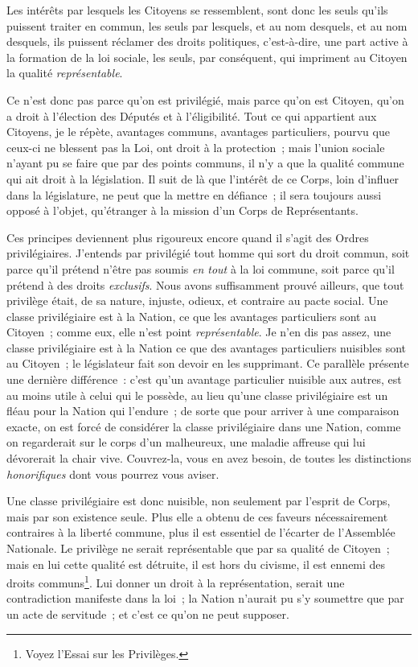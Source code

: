 \documentclass[french,twoside]{book} %
\begin{document}
Les intérêts par lesquels les Citoyens se ressemblent, sont donc les seuls qu’ils puissent traiter en commun, les seuls par lesquels, et au nom desquels, et au nom desquels, ils puissent réclamer des droits politiques, c’est-à-dire, une part active à la formation de la loi sociale, les seuls, par conséquent, qui impriment au Citoyen la qualité {\itshape représentable}.\par
Ce n’est donc pas parce qu’on est privilégié, mais parce qu’on est Citoyen, qu’on a droit à l’élection des Députés et à l’éligibilité. Tout ce qui appartient aux Citoyens, je le répète, avantages communs, avantages particuliers, pourvu que ceux-ci ne blessent pas la Loi, ont droit à la protection ; mais l’union sociale n’ayant pu se faire que par des points communs, il n’y a que la qualité commune qui ait droit à la législation. Il suit de là que l’intérêt de ce Corps, loin d’influer dans la législature, ne peut que la mettre en défiance ; il sera toujours aussi opposé à l’objet, qu’étranger à la mission d’un Corps de Représentants.\par
Ces principes deviennent plus rigoureux encore quand il s’agit des Ordres privilégiaires. J’entends par privilégié tout homme qui sort du droit commun, soit parce qu’il prétend n’être pas soumis {\itshape en tout} à la loi commune, soit parce qu’il prétend à des droits {\itshape exclusifs}. Nous avons suffisamment prouvé ailleurs, que tout privilège était, de sa nature, injuste, odieux, et contraire au pacte social. Une classe privilégiaire est à la Nation, ce que les avantages particuliers sont au Citoyen ; comme eux, elle n’est point {\itshape représentable}. Je n’en dis pas assez, une classe privilégiaire est à la Nation ce que des avantages particuliers nuisibles sont au Citoyen ; le législateur fait son devoir en les supprimant. Ce parallèle présente une dernière différence : c’est qu’un avantage particulier nuisible aux autres, est au moins utile à celui qui le possède, au lieu qu’une classe privilégiaire est un fléau pour la Nation qui l’endure ; de sorte que pour arriver à une comparaison exacte, on est forcé de considérer la classe privilégiaire dans une Nation, comme on regarderait sur le corps d’un malheureux, une maladie affreuse qui lui dévorerait la chair vive. Couvrez-la, vous en avez besoin, de toutes les distinctions {\itshape honorifiques} dont vous pourrez vous aviser.\par
Une classe privilégiaire est donc nuisible, non seulement par l’esprit de Corps, mais par son existence seule. Plus elle a obtenu de ces faveurs nécessairement contraires à la liberté commune, plus il est essentiel de l’écarter de l’Assemblée Nationale. Le privilège ne serait représentable que par sa qualité de Citoyen ; mais en lui cette qualité est détruite, il est hors du civisme, il est ennemi des droits communs\footnote{Voyez l’Essai sur les Privilèges.}. Lui donner un droit à la représentation, serait une contradiction manifeste dans la loi ; la Nation n’aurait pu s’y soumettre que par un acte de servitude ; et c’est ce qu’on ne peut supposer.\par
\end{document}
